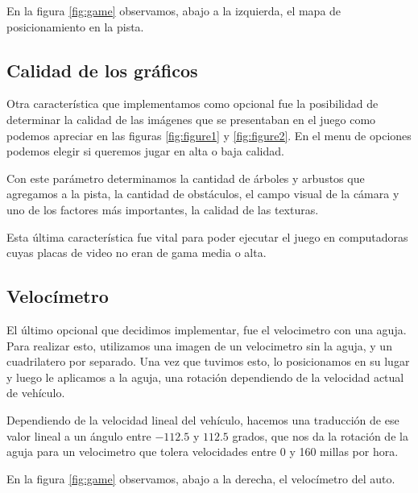 \documentclass[a4paper,10pt]{article}
\begin{document}
En la figura \ref{fig:game} observamos, abajo a la izquierda, el mapa de
posicionamiento en la pista.

\subsection{Calidad de los gr\'aficos}

Otra caracter\'istica que implementamos como opcional fue la posibilidad de
determinar la calidad de las im\'agenes que se presentaban en el juego
como podemos apreciar en las figuras \ref{fig:figure1} y \ref{fig:figure2}.
En el menu de opciones podemos elegir si queremos jugar en alta o baja
calidad.

Con este par\'ametro determinamos la cantidad de \'arboles y arbustos que
agregamos a la pista, la cantidad de obst\'aculos, el campo visual de la
c\'amara y uno de los factores m\'as importantes, la calidad de las texturas.

Esta \'ultima caracter\'istica fue vital para poder ejecutar el juego en
computadoras cuyas placas de video no eran de gama media o alta.

\subsection{Veloc\'imetro}

El \'ultimo opcional que decidimos implementar, fue el velocimetro con una
aguja.  Para realizar esto, utilizamos una imagen de un velocimetro sin la
aguja, y un cuadrilatero por separado.  Una vez que tuvimos esto, lo
posicionamos en su lugar y luego le aplicamos a la aguja, una rotaci\'on
dependiendo de la velocidad actual de veh\'iculo.

Dependiendo de la velocidad lineal del veh\'iculo, hacemos una traducci\'on de
ese valor lineal a un \'angulo entre $-112.5$ y $112.5$ grados, que nos da la
rotaci\'on de la aguja para un velocimetro que tolera velocidades entre 0 y 160
millas por hora.

En la figura \ref{fig:game} observamos, abajo a la derecha, el
veloc\'imetro del auto.
\end{document}
